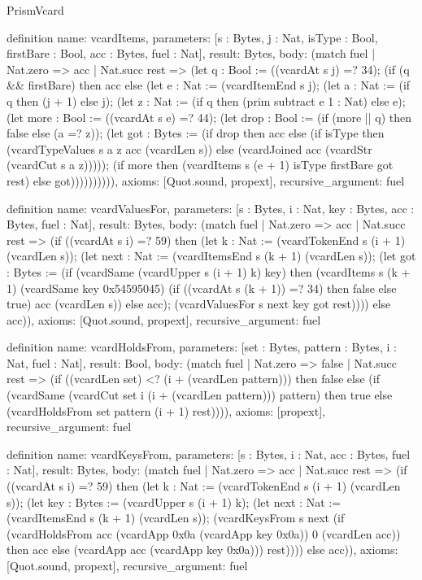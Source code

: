 \begin{lexlean}{PrismVcard}
\begin{semanticmodule}
definition{
  name: vcardItems,
  parameters: [s : Bytes, j : Nat, isType : Bool, firstBare : Bool, acc : Bytes, fuel : Nat],
  result: Bytes,
  body: (match fuel
    | Nat.zero => acc
    | Nat.succ rest => (let q : Bool := ((vcardAt s j) =? 34); (if (q && firstBare) then acc else (let e : Nat := (vcardItemEnd s j); (let a : Nat := (if q then (j + 1) else j); (let z : Nat := (if q then (prim subtract e 1 : Nat) else e); (let more : Bool := ((vcardAt s e) =? 44); (let drop : Bool := (if (more || q) then false else (a =? z)); (let got : Bytes := (if drop then acc else (if isType then (vcardTypeValues s a z acc (vcardLen s)) else (vcardJoined acc (vcardStr (vcardCut s a z))))); (if more then (vcardItems s (e + 1) isType firstBare got rest) else got)))))))))),
  axioms: [Quot.sound, propext],
  recursive_argument: fuel
}

definition{
  name: vcardValuesFor,
  parameters: [s : Bytes, i : Nat, key : Bytes, acc : Bytes, fuel : Nat],
  result: Bytes,
  body: (match fuel
    | Nat.zero => acc
    | Nat.succ rest => (if ((vcardAt s i) =? 59) then (let k : Nat := (vcardTokenEnd s (i + 1) (vcardLen s)); (let next : Nat := (vcardItemsEnd s (k + 1) (vcardLen s)); (let got : Bytes := (if (vcardSame (vcardUpper s (i + 1) k) key) then (vcardItems s (k + 1) (vcardSame key 0x54595045) (if ((vcardAt s (k + 1)) =? 34) then false else true) acc (vcardLen s)) else acc); (vcardValuesFor s next key got rest)))) else acc)),
  axioms: [Quot.sound, propext],
  recursive_argument: fuel
}

definition{
  name: vcardHoldsFrom,
  parameters: [set : Bytes, pattern : Bytes, i : Nat, fuel : Nat],
  result: Bool,
  body: (match fuel
    | Nat.zero => false
    | Nat.succ rest => (if ((vcardLen set) <? (i + (vcardLen pattern))) then false else (if (vcardSame (vcardCut set i (i + (vcardLen pattern))) pattern) then true else (vcardHoldsFrom set pattern (i + 1) rest)))),
  axioms: [propext],
  recursive_argument: fuel
}

definition{
  name: vcardKeysFrom,
  parameters: [s : Bytes, i : Nat, acc : Bytes, fuel : Nat],
  result: Bytes,
  body: (match fuel
    | Nat.zero => acc
    | Nat.succ rest => (if ((vcardAt s i) =? 59) then (let k : Nat := (vcardTokenEnd s (i + 1) (vcardLen s)); (let key : Bytes := (vcardUpper s (i + 1) k); (let next : Nat := (vcardItemsEnd s (k + 1) (vcardLen s)); (vcardKeysFrom s next (if (vcardHoldsFrom acc (vcardApp 0x0a (vcardApp key 0x0a)) 0 (vcardLen acc)) then acc else (vcardApp acc (vcardApp key 0x0a))) rest)))) else acc)),
  axioms: [Quot.sound, propext],
  recursive_argument: fuel
}


\end{semanticmodule}
\end{lexlean}
